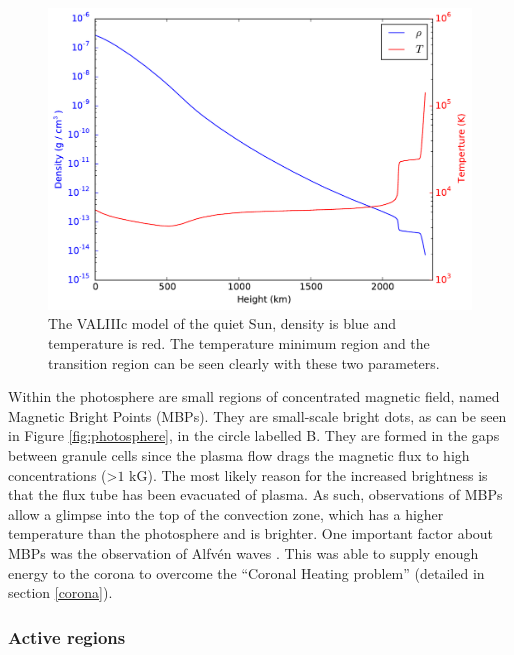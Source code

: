     \begin{figure}    
       	\centering
       	\includegraphics[width=\textwidth]{val3.pdf}
       	\caption{
       		     The VALIIIc \citep{1981ApJS...45..635V} model of the quiet Sun, density is blue and temperature is red.
       		     The temperature minimum region and the transition region can be seen clearly with these two parameters.
                 }
       	\label{fig:valc}        
    \end{figure} 
    
    Within the photosphere are small regions of concentrated magnetic field, named Magnetic Bright Points (MBPs).
    They are small-scale bright dots, as can be seen in Figure \ref{fig:photosphere}, in the circle labelled B.
    They are formed in the gaps between granule cells since the plasma flow drags the magnetic flux to high concentrations (>$1$ kG).
    The most likely reason for the increased brightness is that the flux tube has been evacuated of plasma.
    As such, observations of MBPs allow a glimpse into the top of the convection zone, which has a higher temperature than the photosphere and is brighter.
    One important factor about MBPs was the observation of Alfv\'en waves \citep{Jess2009,Taroyan2009}.
    This was able to supply enough energy to the corona to overcome the ``Coronal Heating problem'' (detailed in section \ref{corona}).
    
\subsubsection{Active regions}
    
